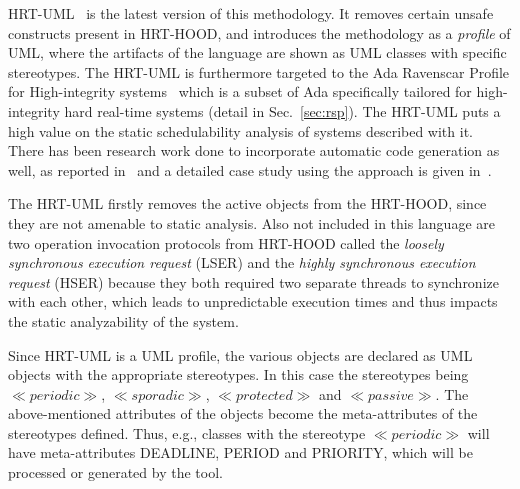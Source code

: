 HRT-UML~\cite{mazzini@ae03} is the latest version of this
methodology. It removes certain unsafe constructs present in HRT-HOOD,
and introduces the methodology as a \emph{profile} of UML, where the
artifacts of the language are shown as UML classes with specific
stereotypes. The HRT-UML is furthermore targeted to the Ada Ravenscar
Profile for High-integrity systems~\cite{burns@adalett04} which is a
subset of Ada specifically tailored for high-integrity hard real-time
systems (detail in Sec.~\ref{sec:rsp}). The HRT-UML puts a high value
on the static schedulability analysis of systems described with
it. There has been research work done to incorporate automatic code
generation as well, as reported in~\cite{vardanega@ecrts05} and a
detailed case study using the approach is given
in~\cite{silvia-hrt-uml-cs}.

The HRT-UML firstly removes the active objects from the HRT-HOOD,
since they are not amenable to static analysis. Also not included in
this language are two operation invocation protocols from HRT-HOOD
called the \emph{loosely synchronous execution request} (LSER) and the
\emph{highly synchronous execution request} (HSER) because they both
required two separate threads to synchronize with each other, which
leads to unpredictable execution times and thus impacts the static
analyzability of the system.

Since HRT-UML is a UML profile, the various objects are declared as
UML objects with the appropriate stereotypes. In this case the
stereotypes being $\ll periodic\gg$, $\ll sporadic\gg$, $\ll
protected\gg$ and $\ll passive\gg$. The above-mentioned attributes of
the objects become the meta-attributes of the stereotypes
defined. Thus, e.g., classes with the stereotype $\ll periodic\gg$
will have meta-attributes DEADLINE, PERIOD and PRIORITY, which will be
processed or generated by the tool.

